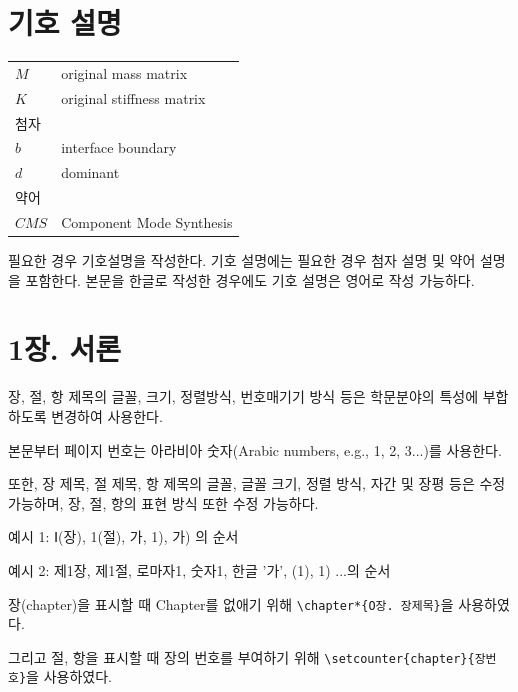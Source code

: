 \documentclass[11pt]{report}
\numberwithin{figure}{chapter}
\begin{document}
\newpage
{}
\chapter*{기호 설명}

\normalsize
\begin{tabular}{p{}p{}}
$M$	& original mass matrix\\
$K$	& original stiffness matrix\\[30pt]
\multicolumn{2}{l}{첨자}\\
$b$ & interface boundary\\
$d$ & dominant\\[30pt]
\multicolumn{2}{l}{약어}\\
$CMS$ & Component Mode Synthesis\\
\end{tabular}

\vspace{1cm}

필요한 경우 기호설명을 작성한다. 기호 설명에는 필요한 경우 첨자 설명 및 약어 설명을 포함한다. 본문을 한글로 작성한 경우에도 기호 설명은 영어로 작성 가능하다.

\newpage %

\chapter*{1장. 서론}
\setcounter{chapter}{1}

장, 절, 항 제목의 글꼴, 크기, 정렬방식, 번호매기기 방식 등은 학문분야의 특성에 부합하도록 변경하여 사용한다. \par
본문부터 페이지 번호는 아라비아 숫자(Arabic numbers, e.g., 1, 2, 3...)를 사용한다.\par
또한, 장 제목, 절 제목, 항 제목의 글꼴, 글꼴 크기, 정렬 방식, 자간 및 장평 등은 수정 가능하며, 장, 절, 항의 표현 방식 또한 수정 가능하다. \par
\bigskip
예시 1: Ⅰ(장), 1(절), 가, 1), 가) 의 순서 \par
예시 2: 제1장, 제1절, 로마자1, 숫자1, 한글 '가', (1), 1) ...의 순서 \par
\bigskip

장(chapter)을 표시할 때 Chapter를 없애기 위해 \verb|\chapter*{O장. 장제목}|을 사용하였다.\par
그리고 절, 항을 표시할 때 장의 번호를 부여하기 위해 \verb|\setcounter{chapter}{장번호}|을 사용하였다.\par
\end{document}
